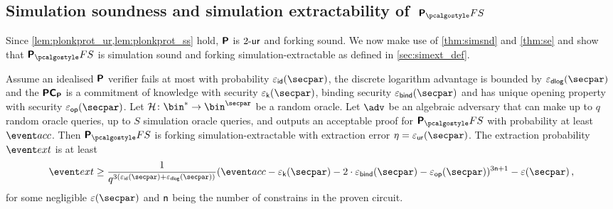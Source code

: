 \documentclass[runningheads,11pt]{llncs}
\begin{document}
\subsection{Simulation soundness and simulation
  extractability of~$\plonkprotfs$}
Since \cref{lem:plonkprot_ur,lem:plonkprot_ss} hold, $\bm{\mathsf{P}}$ is ${2\text{-}\mathsf{ur}}$
and forking sound. We now make use of \cref{thm:simsnd} and \cref{thm:se} and show that
$\plonkprot_\fs$ is simulation sound and forking simulation-extractable as defined in
\cref{sec:simext_def}.

\begin{corollary}
\label{thm:plonkprotfs_se}
Assume an idealised $\bm{\mathsf{P}}$ verifier fails at most with probability
$\epsid(\secpar)$, the discrete logarithm advantage is bounded by
$\epsdlog(\secpar)$ and the $\bm{\mathsf{PC}}_{\bm{\mathsf{P}}}$ is a commitment of knowledge with security
$\epsk(\secpar)$, binding security $\epsbind(\secpar)$ and has unique opening
property with security $\epsop(\secpar)$. Let
$\ro\colon \bin^* \to \bin^\secpar$ be a random oracle. Let $\advse$ be an
algebraic adversary that can make up to $q$ random oracle queries, up to $S$
simulation oracle queries, and outputs an acceptable proof for $\plonkprotfs$
with probability at least $\accProb$. Then $\plonkprotfs$ is forking
simulation-extractable with extraction error $\eta = \epsur(\secpar)$. The
extraction probability $\extProb$ is at least
\[
	\extProb \geq \frac{1}{q^{3 (\epsid(\secpar)+\epsdlog(\secpar))}} (\accProb - \epsk(\secpar) - 2\cdot\epsbind(\secpar) -
  \epsop(\secpar))^{3\noofc + 1} -\eps(\secpar)\,,
\]
for some negligible $\eps(\secpar)$ and $\mathsf{n}$ being the number of
constrains in the proven circuit.
\end{corollary}

\end{document}
